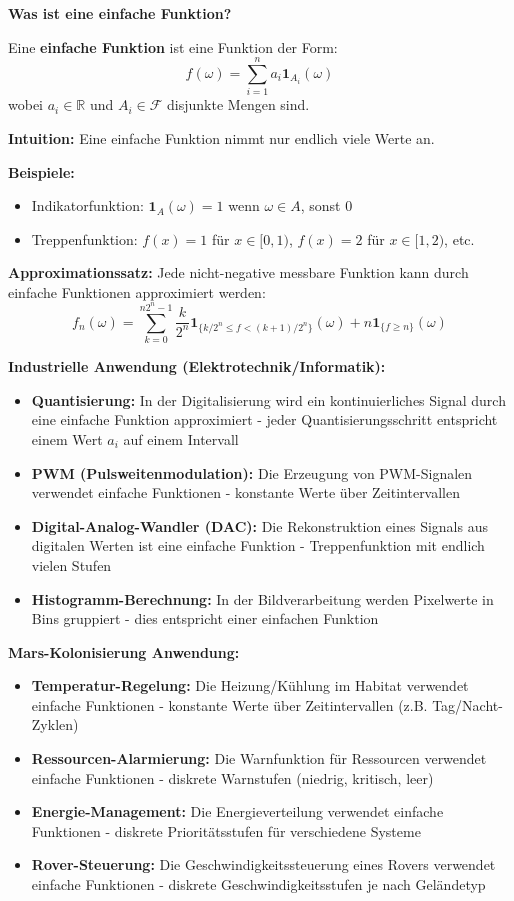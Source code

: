 \begin{denoobification}
\textbf{Was ist eine einfache Funktion?}

Eine \textbf{einfache Funktion} ist eine Funktion der Form:
\[
f(\omega) = \sum_{i=1}^{n} a_i \mathbf{1}_{A_i}(\omega)
\]
wobei $a_i \in \mathbb{R}$ und $A_i \in \mathcal{F}$ disjunkte Mengen sind.

\textbf{Intuition:} Eine einfache Funktion nimmt nur endlich viele Werte an.

\textbf{Beispiele:}
\begin{itemize}
    \item Indikatorfunktion: $\mathbf{1}_A(\omega) = 1$ wenn $\omega \in A$, sonst $0$
    \item Treppenfunktion: $f(x) = 1$ für $x \in [0,1)$, $f(x) = 2$ für $x \in [1,2)$, etc.
\end{itemize}

\textbf{Approximationssatz:} Jede nicht-negative messbare Funktion kann durch einfache Funktionen approximiert werden:
\[
f_n(\omega) = \sum_{k=0}^{n2^n - 1} \frac{k}{2^n} \mathbf{1}_{\{k/2^n \leq f < (k+1)/2^n\}}(\omega) + n \mathbf{1}_{\{f \geq n\}}(\omega)
\]

\textbf{Industrielle Anwendung (Elektrotechnik/Informatik):}
\begin{itemize}
    \item \textbf{Quantisierung:} In der Digitalisierung wird ein kontinuierliches Signal durch eine einfache Funktion approximiert - jeder Quantisierungsschritt entspricht einem Wert $a_i$ auf einem Intervall
    \item \textbf{PWM (Pulsweitenmodulation):} Die Erzeugung von PWM-Signalen verwendet einfache Funktionen - konstante Werte über Zeitintervallen
    \item \textbf{Digital-Analog-Wandler (DAC):} Die Rekonstruktion eines Signals aus digitalen Werten ist eine einfache Funktion - Treppenfunktion mit endlich vielen Stufen
    \item \textbf{Histogramm-Berechnung:} In der Bildverarbeitung werden Pixelwerte in Bins gruppiert - dies entspricht einer einfachen Funktion
\end{itemize}

\textbf{Mars-Kolonisierung Anwendung:}
\begin{itemize}
    \item \textbf{Temperatur-Regelung:} Die Heizung/Kühlung im Habitat verwendet einfache Funktionen - konstante Werte über Zeitintervallen (z.B. Tag/Nacht-Zyklen)
    \item \textbf{Ressourcen-Alarmierung:} Die Warnfunktion für Ressourcen verwendet einfache Funktionen - diskrete Warnstufen (niedrig, kritisch, leer)
    \item \textbf{Energie-Management:} Die Energieverteilung verwendet einfache Funktionen - diskrete Prioritätsstufen für verschiedene Systeme
    \item \textbf{Rover-Steuerung:} Die Geschwindigkeitssteuerung eines Rovers verwendet einfache Funktionen - diskrete Geschwindigkeitsstufen je nach Geländetyp
\end{itemize}


\end{denoobification}
